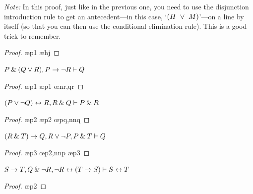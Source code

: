 {{{{{{{{{\begin{small}
\begin{earg}
\textit{Note:} In this proof, just like in the previous one, you need to use the disjunction introduction rule to get an antecedent---in this case, `$(H~\vee~M)$'---on a line by itself (so that you can then use the conditional elimination rule). This is a good trick to remember. 
\begin{proof}
	 \pr{}
	 \pr{}
	 \ae{p1}
	 \ae{hj}
	 
	 
\end{proof}
\medskip


\noindent\begin{minipage}{0.99\textwidth}
\item $P \mathbin{\&} (Q \vee R), P \rightarrow {\neg} R \vdash Q$
\begin{proof}
	 \pr{}
	 \pr{}
	 \ae{p1}
	 
	 \ae{p1}
	 \oe{nr,qr}
\end{proof}
\end{minipage}
\medskip

\noindent\begin{minipage}{0.99\textwidth}
\item $(P \vee {\neg} Q) \leftrightarrow R, R \mathbin{\&} Q \vdash P \mathbin{\&} R$\smallskip
\begin{proof}
 \pr{}
 \pr{}
 \ae{p2}
 
 \ae{p2}
 
 \oe{pq,nnq}
 
\end{proof}
\medskip
\end{minipage}


\noindent\begin{minipage}{0.99\textwidth}
\item $(R \mathbin{\&} T) \rightarrow Q, R \vee {\neg} P, P \mathbin{\&} T \vdash Q$\smallskip
\begin{proof}
 \pr{}
 \pr{}
 \pr{}
 \ae{p3}
 
 \oe{p2,nnp}
 \ae{p3}
 
 
\end{proof}
\end{minipage}
\medskip


\item $S \rightarrow T, Q \mathbin{\&} {\neg} R, {\neg} R \leftrightarrow (T \rightarrow S) \vdash S \leftrightarrow T $\smallskip
\begin{proof}
 \pr{}
 \pr{}
 \pr{}
 \ae{p2}
 
 
\end{proof}
\medskip



\end{earg}
\end{small}}}}}}}}}}
